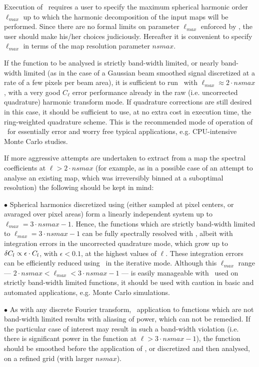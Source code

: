 \begin{recommend}
{
Execution of \thedocid\ requires a user to specify the maximum 
spherical harmonic order $\ell_{max}$ up to which the harmonic 
decomposition of the input maps will be performed.
Since there are no formal limits on parameter
$\ell_{max}$ enforced by \thedocid, the user should make his/her choices
judiciously. 
Hereafter it is convenient to specify $\ell_{max}$  
in terms of the \healpix
map resolution parameter $nsmax$.

If the function to be analysed is strictly  band-width
limited, or nearly band-width limited (as in the case of 
a Gaussian beam smoothed signal discretized at a rate of a few pixels
per beam area), it is  sufficient to run \thedocid\ with
$\ell_{max} \approx 2\cdot nsmax$, with a very good $C_\ell$ 
error performance 
already in the raw (i.e. uncorrected quadrature) harmonic transform mode. 
If quadrature 
corrections are still desired in this case, it should be sufficient to use, at no
extra cost in execution time, the ring-weighted quadrature scheme. 
This is the recommended mode of operation of \thedocid\ for essentially
error and worry free typical applications, e.g. CPU-intensive 
Monte Carlo studies. 

If more aggressive attempts are undertaken to extract from a map 
the spectral coefficients at $\ell > 2\cdot nsmax$ (for example, as 
in a possible case of an attempt to analyse an existing map, which was 
irreversibly binned  at a suboptimal resolution) 
the following should be kept in mind:

$\bullet$ Spherical harmonics discretized using \healpix 
(either sampled at
pixel centers, or avaraged over pixel areas) form a linearly independent
system up to $\ell_{max} = 3 \cdot nsmax -1$. Hence, the functions which are
strictly band-width limited to $\ell_{max} = 3 \cdot nsmax - 1 $ 
can be fully
spectrally resolved with \thedocid, albeit with integration errors
in the uncorrected quadrature mode, which grow up to 
$\delta C_l \propto \epsilon \cdot C_l$, with $\epsilon <0.1$, 
at the highest values of $\ell$. These integration  errors 
can be efficiently 
reduced
using \thedocid\ in the iterative mode. Although this $\ell_{max}$ range
--- $2 \cdot nsmax < \ell_{max} < 3 \cdot nsmax - 1$ --- is easily
manageable with \thedocid\ used on strictly band-width limited functions,
it should be used with caution in basic and automated applications, e.g.
Monte Carlo simulations.

$\bullet$ As with any discrete Fourier transform, \thedocid\ application to
functions which are not band-width limited results with aliasing
of power, which can not be remedied. If the particular case of interest
may result in such a band-width violation (i.e. there is significant power
in the function at $\ell > 3 \cdot nsmax -1$), the function should
be smoothed before the application of \thedocid, or discretized and
then analysed, on a refined \healpix grid (with larger $nsmax$).

}
\end{recommend}
